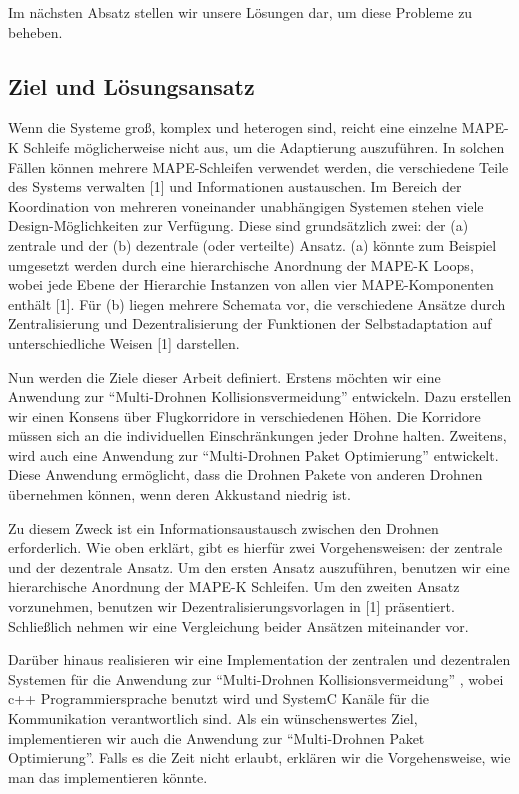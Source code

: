 \documentclass[a4paper,titlepage,onecolumn,twoside,12pt]{article}
\begin{document}
Im nächsten Absatz stellen wir unsere Lösungen dar, um diese Probleme zu beheben.
\subsection{Ziel und Lösungsansatz}
\label{subsec:ziel}
Wenn die Systeme groß, komplex und heterogen sind, reicht eine einzelne MAPE-K Schleife möglicherweise nicht aus, um die Adaptierung auszuführen. In 
solchen Fällen können mehrere MAPE-Schleifen verwendet werden, die verschiedene Teile des Systems verwalten [1] und Informationen austauschen. Im Bereich 
der Koordination von mehreren voneinander unabhängigen Systemen stehen viele Design-Möglichkeiten zur Verfügung. Diese sind grundsätzlich zwei: der (a) 
zentrale und der (b) dezentrale (oder verteilte) Ansatz. (a) könnte zum Beispiel umgesetzt werden durch eine hierarchische Anordnung der MAPE-K Loops, 
wobei jede Ebene der Hierarchie Instanzen von allen vier MAPE-Komponenten enthält [1]. Für (b) liegen mehrere Schemata vor, die verschiedene Ansätze durch 
Zentralisierung und Dezentralisierung der Funktionen der Selbstadaptation auf unterschiedliche Weisen [1] darstellen. 



Nun werden die Ziele dieser Arbeit definiert. Erstens möchten wir eine Anwendung zur “Multi-Drohnen Kollisionsvermeidung” entwickeln. Dazu erstellen wir 
einen Konsens über Flugkorridore in verschiedenen Höhen. Die Korridore müssen sich an die individuellen Einschränkungen jeder Drohne halten. Zweitens, wird 
auch eine Anwendung zur “Multi-Drohnen Paket Optimierung” entwickelt. Diese Anwendung ermöglicht, dass die Drohnen Pakete von anderen Drohnen übernehmen 
können, wenn deren Akkustand niedrig ist.

 
Zu diesem Zweck  ist ein Informationsaustausch zwischen den Drohnen erforderlich. Wie oben erklärt, gibt es hierfür zwei Vorgehensweisen: der zentrale und 
der dezentrale Ansatz. Um den ersten Ansatz auszuführen, benutzen wir eine hierarchische Anordnung der MAPE-K Schleifen. Um den zweiten Ansatz vorzunehmen, 
benutzen wir Dezentralisierungsvorlagen in [1] präsentiert. Schließlich nehmen wir eine Vergleichung beider Ansätzen miteinander vor.

 
Darüber hinaus realisieren wir eine Implementation der zentralen und dezentralen Systemen für die Anwendung zur “Multi-Drohnen Kollisionsvermeidung” , 
wobei c++ Programmiersprache benutzt wird und SystemC Kanäle für die Kommunikation verantwortlich sind. Als ein wünschenswertes Ziel, implementieren wir 
auch die Anwendung zur “Multi-Drohnen Paket Optimierung”. Falls es die Zeit nicht erlaubt, erklären wir die Vorgehensweise, wie man das implementieren 
könnte.
\end{document}
